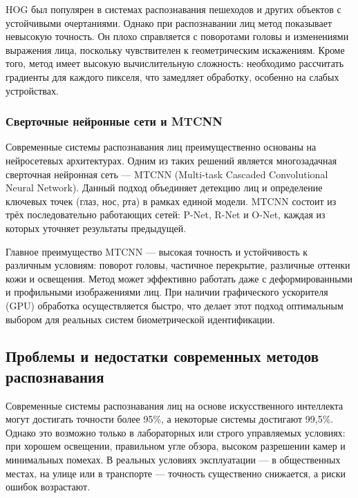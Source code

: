 HOG был популярен в системах распознавания пешеходов и других объектов с устойчивыми очертаниями. Однако при распознавании лиц метод показывает невысокую точность. Он плохо справляется с поворотами головы и изменениями выражения лица, поскольку чувствителен к геометрическим искажениям. Кроме того, метод имеет высокую вычислительную сложность: необходимо рассчитать градиенты для каждого пикселя, что замедляет обработку, особенно на слабых устройствах.

\subsubsection{Сверточные нейронные сети и MTCNN}
Современные системы распознавания лиц преимущественно основаны на нейросетевых архитектурах. Одним из таких решений является многозадачная сверточная нейронная сеть — MTCNN (Multi-task Cascaded Convolutional Neural Network)\cite{MTCNN}. Данный подход объединяет детекцию лиц и определение ключевых точек (глаз, нос, рта) в рамках единой модели. MTCNN состоит из трёх последовательно работающих сетей: P-Net, R-Net и O-Net, каждая из которых уточняет результаты предыдущей.

Главное преимущество MTCNN — высокая точность и устойчивость к различным условиям: поворот головы, частичное перекрытие, различные оттенки кожи и освещения. Метод может эффективно работать даже с деформированными и профильными изображениями лиц. При наличии графического ускорителя (GPU) обработка осуществляется быстро, что делает этот подход оптимальным выбором для реальных систем биометрической идентификации.

\subsection{Проблемы и недостатки современных методов распознавания}

Современные системы распознавания лиц на основе искусственного интеллекта могут достигать точности более 95\%, а некоторые системы достигают 99,5\%\cite{abdulaev}. Однако это возможно только в лабораторных или строго управляемых условиях: при хорошем освещении, правильном угле обзора, высоком разрешении камер и минимальных помехах. В реальных условиях эксплуатации — в общественных местах, на улице или в транспорте — точность существенно снижается, а риски ошибок возрастают.

